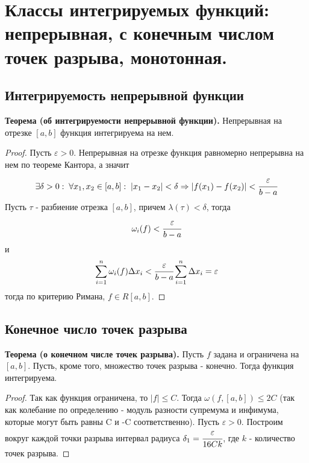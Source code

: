 \documentclass{article}
\newcommand*{\theorem}[2]{\textbf{Теорема #1. } #2 \newline}
\newcommand*{\eps}{\varepsilon}
\begin{document}
\section{Классы интегрируемых функций: непрерывная, с конечным числом точек разрыва, монотонная.}
\subsection{Интегрируемость непрерывной функции}
\theorem{(об интегрируемости непрерывной функции)}{Непрерывная на отрезке $[a, b]$ функция интегрируема на нем.}
\begin{proof}
    Пусть $\eps > 0$. Непрерывная на отрезке функция равномерно непрерывна на нем по теореме Кантора, а значит 
    $$
        \exists \delta > 0: \; \forall x_1, x_2 \in [a, b]: \; |x_1 - x_2| < \delta \Rightarrow |f(x_1) - f(x_2)| < \cfrac{\eps}{b - a}
    $$
    Пусть $\tau$ - разбиение отрезка $[a, b]$, причем $\lambda(\tau) < \delta$, тогда
    $$
        \omega_i(f) < \cfrac{\eps}{b - a}
    $$
    и 
    $$
        \sum_{i = 1}^{n} \omega_i(f) \Delta x_i < \cfrac{\eps}{b - a}\sum_{i = 1}^{n} \Delta x_i = \eps
    $$
    тогда по критерию Римана, $f \in R[a, b]$.
\end{proof}
\subsection{Конечное число точек разрыва}
\theorem{(о конечном числе точек разрыва)}{Пусть $f$ задана и ограничена на $[a, b]$. Пусть, кроме того, множество точек разрыва - конечно. Тогда функция интегрируема.}
\begin{proof}
    Так как функция ограничена, то $|f| \leq C$. Тогда $\omega(f, [a, b]) \leq 2C$ (так как колебание по определению - модуль разности супремума и инфимума, которые могут быть равны C и -C соответственно). Пусть $\eps > 0$. Построим вокруг каждой точки разрыва интервал радиуса $\delta_1 = \cfrac{\eps}{16Ck}$, где $k$ - количество точек разрыва.
    
\end{proof}
\end{document}
